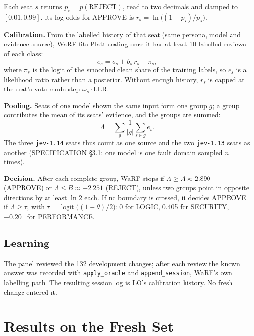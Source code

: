 \documentclass[11pt,a4paper]{article}
\begin{document}
Each seat $s$ returns $p_s = p(\mathrm{REJECT})$, read to two decimals and
clamped to $[0.01, 0.99]$. Its log-odds for APPROVE is
$r_s = \ln\bigl((1-p_s)/p_s\bigr)$.

\textbf{Calibration.} From the labelled history of that seat (same persona,
model and evidence source), WaRF fits Platt scaling once it has at least 10
labelled reviews of each class:
\[
  e_s = a_s + b_s\, r_s - \pi_s,
\]
where $\pi_s$ is the logit of the smoothed clean share of the training labels,
so $e_s$ is a likelihood ratio rather than a posterior. Without enough history,
$r_s$ is capped at the seat's vote-mode step $\omega_s \cdot \mathrm{LLR}$.

\textbf{Pooling.} Seats of one model shown the same input form one group $g$;
a group contributes the mean of its seats' evidence, and the groups are summed:
\[
  \Lambda = \sum_{g} \frac{1}{|g|} \sum_{s \in g} e_s .
\]
The three \texttt{jev-1.14} seats thus count as one source and the two
\texttt{jev-1.13} seats as another (SPECIFICATION \S3.1: one model is one fault
domain sampled $n$ times).

\textbf{Decision.} After each complete group, WaRF stops if
$\Lambda \ge A \approx 2.890$ (APPROVE) or $\Lambda \le B \approx -2.251$
(REJECT), unless two groups point in opposite directions by at least $\ln 2$
each. If no boundary is crossed, it decides APPROVE if $\Lambda \ge \tau$,
with $\tau = \operatorname{logit}\bigl((1+\theta)/2\bigr)$: 0 for LOGIC,
0.405 for SECURITY, $-0.201$ for PERFORMANCE.

\subsection{Learning}

The panel reviewed the 132 development changes; after each review the known
answer was recorded with \texttt{apply\_oracle} and \texttt{append\_session},
WaRF's own labelling path. The resulting session log is LO's calibration
history. No fresh change entered it.

\section{Results on the Fresh Set}
\end{document}
